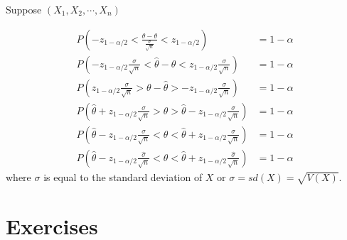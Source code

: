 Suppose $(X_{1},X_{2},\cdots,X_{n})$

\begin{align}
    P\left( -z_{1-\alpha/2} < \frac{\hat{\theta} - \theta}{ \frac{\sigma}{\sqrt{n}}  } < z_{1-\alpha/2} \right) &= 1-\alpha \\ 
    P\left( -z_{1-\alpha/2} \frac{\sigma}{\sqrt{n}} < \hat{\theta} - \theta < z_{1-\alpha/2} \frac{\sigma}{\sqrt{n}} \right)&= 1-\alpha\\ 
    P\left( z_{1-\alpha/2} \frac{\sigma}{\sqrt{n}} > \theta - \hat{\theta} > -z_{1-\alpha/2} \frac{\sigma}{\sqrt{n}} \right) &= 1-\alpha\\ 
    P\left( \hat{\theta} + z_{1-\alpha/2} \frac{\sigma}{\sqrt{n}} > \theta   > \hat{\theta} -z_{1-\alpha/2} \frac{\sigma}{\sqrt{n}} \right)&= 1-\alpha \\ 
    P\left( \hat{\theta} - z_{1-\alpha/2} \frac{\sigma}{\sqrt{n}} < \theta   < \hat{\theta} +z_{1-\alpha/2} \frac{\sigma}{\sqrt{n}} \right) &= 1-\alpha\\
    P\left( \hat{\theta} - z_{1-\alpha/2} \frac{\hat{\sigma}}{\sqrt{n}} < \theta   < \hat{\theta} +z_{1-\alpha/2} \frac{\hat{\sigma}}{\sqrt{n}} \right) &= 1-\alpha
\end{align}
where $\sigma$ is equal to the standard deviation of $X$ or $\sigma = sd(X) = \sqrt{V(X)}$. 


\section{Exercises}

